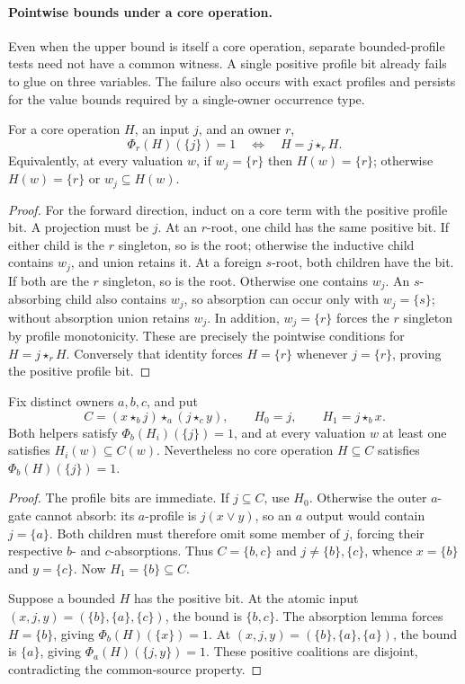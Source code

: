 \paragraph{Pointwise bounds under a core operation.}
Even when the upper bound is itself a core operation, separate bounded-profile
tests need not have a common witness. A single positive profile bit already
fails to glue on three variables. The failure also occurs with exact profiles
and persists for the value bounds required by a single-owner occurrence type.

\begin{lemma}\label{core:lem:singleton-profile-absorption}
For a core operation $H$, an input $j$, and an owner $r$,
\[
 \Phi_r(H)(\{j\})=1
 \quad\Longleftrightarrow\quad H=j\star_r H.
\]
Equivalently, at every valuation $w$, if $w_j=\{r\}$ then
$H(w)=\{r\}$; otherwise $H(w)=\{r\}$ or $w_j\subseteq H(w)$.
\end{lemma}
\begin{proof}
For the forward direction, induct on a core term with the positive profile
bit. A projection must be $j$. At an $r$-root, one child has the same
positive bit. If either child is the $r$ singleton, so is the root;
otherwise the inductive child contains $w_j$, and union retains it.
At a foreign $s$-root, both children have the bit. If both are the $r$
singleton, so is the root. Otherwise one contains $w_j$. An $s$-absorbing
child also contains $w_j$, so absorption can occur only with
$w_j=\{s\}$; without absorption union retains $w_j$.
In addition, $w_j=\{r\}$ forces the $r$ singleton by profile monotonicity.
These are precisely the pointwise conditions for $H=j\star_r H$.
Conversely that identity forces $H=\{r\}$ whenever $j=\{r\}$, proving
the positive profile bit.
\end{proof}

\begin{proposition}
\label{core:prop:singleton-profile-bound-gluing}
Fix distinct owners $a,b,c$, and put
\[
 C=(x\star_b j)\star_a(j\star_c y),\qquad
 H_0=j,\qquad H_1=j\star_b x.
\]
Both helpers satisfy $\Phi_b(H_i)(\{j\})=1$, and at every valuation $w$
at least one satisfies $H_i(w)\subseteq C(w)$. Nevertheless no core
operation $H\subseteq C$ satisfies $\Phi_b(H)(\{j\})=1$.
\end{proposition}
\begin{proof}
The profile bits are immediate. If $j\subseteq C$, use $H_0$.
Otherwise the outer $a$-gate cannot absorb: its $a$-profile is
$j(x\lor y)$, so an $a$ output would contain $j=\{a\}$.
Both children must therefore omit some member of $j$, forcing their
respective $b$- and $c$-absorptions. Thus $C=\{b,c\}$ and
$j\ne\{b\},\{c\}$, whence $x=\{b\}$ and $y=\{c\}$.
Now $H_1=\{b\}\subseteq C$.

Suppose a bounded $H$ has the positive bit. At the atomic input
$(x,j,y)=(\{b\},\{a\},\{c\})$, the bound is $\{b,c\}$.
The absorption lemma forces $H=\{b\}$, giving
$\Phi_b(H)(\{x\})=1$. At
$(x,j,y)=(\{b\},\{a\},\{a\})$, the bound is $\{a\}$, giving
$\Phi_a(H)(\{j,y\})=1$. These positive coalitions are disjoint,
contradicting the common-source property.
\end{proof}

